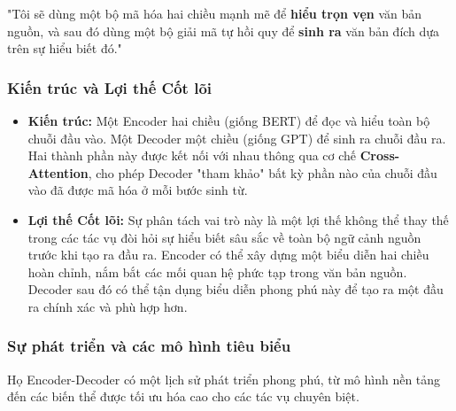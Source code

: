 \begin{tcolorbox}[
    title=Triết lý của Encoder-Decoder,
    colback=green!5!white, colframe=green!60!black, fonttitle=\bfseries
]
"Tôi sẽ dùng một bộ mã hóa hai chiều mạnh mẽ để \textbf{hiểu trọn vẹn} văn bản nguồn, và sau đó dùng một bộ giải mã tự hồi quy để \textbf{sinh ra} văn bản đích dựa trên sự hiểu biết đó."
\end{tcolorbox}

\subsubsection{Kiến trúc và Lợi thế Cốt lõi}
\begin{itemize}
    \item \textbf{Kiến trúc:} Một Encoder hai chiều (giống BERT) để đọc và hiểu toàn bộ chuỗi đầu vào. Một Decoder một chiều (giống GPT) để sinh ra chuỗi đầu ra. Hai thành phần này được kết nối với nhau thông qua cơ chế \textbf{Cross-Attention}, cho phép Decoder "tham khảo" bất kỳ phần nào của chuỗi đầu vào đã được mã hóa ở mỗi bước sinh từ.
    \item \textbf{Lợi thế Cốt lõi:} Sự phân tách vai trò này là một lợi thế không thể thay thế trong các tác vụ đòi hỏi sự hiểu biết sâu sắc về toàn bộ ngữ cảnh nguồn trước khi tạo ra đầu ra. Encoder có thể xây dựng một biểu diễn hai chiều hoàn chỉnh, nắm bắt các mối quan hệ phức tạp trong văn bản nguồn. Decoder sau đó có thể tận dụng biểu diễn phong phú này để tạo ra một đầu ra chính xác và phù hợp hơn.
\end{itemize}

\subsubsection{Sự phát triển và các mô hình tiêu biểu}
Họ Encoder-Decoder có một lịch sử phát triển phong phú, từ mô hình nền tảng đến các biến thể được tối ưu hóa cao cho các tác vụ chuyên biệt.

